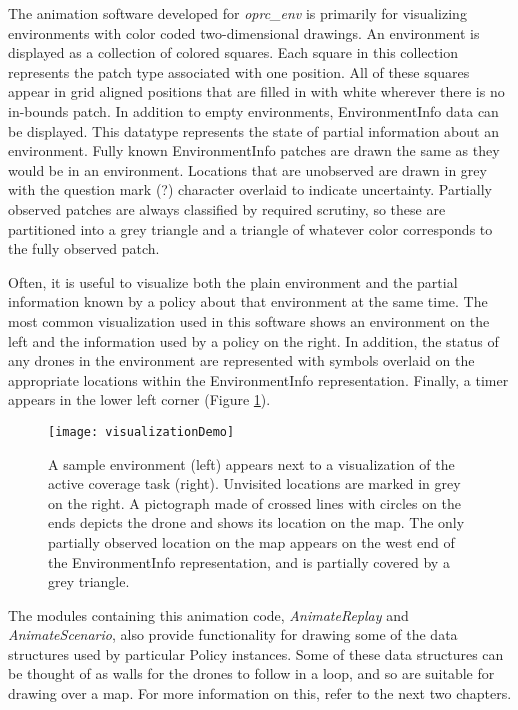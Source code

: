 The animation software developed for \textit{oprc\_env} is primarily for visualizing environments with color coded two-dimensional drawings. An environment is displayed as a collection of colored squares. Each square in this collection represents the patch type associated with one position. All of these squares appear in grid aligned positions that are filled in with white wherever there is no in-bounds patch. In addition to empty environments, EnvironmentInfo data can be displayed. This datatype represents the state of partial information about an environment. Fully known EnvironmentInfo patches are drawn the same as they would be in an environment. Locations that are unobserved are drawn in grey with the question mark (?) character overlaid to indicate uncertainty. Partially observed patches are always classified by required scrutiny, so these are partitioned into a grey triangle and a triangle of whatever color corresponds to the fully observed patch.

Often, it is useful to visualize both the plain environment and the partial information known by a policy about that environment at the same time. The most common visualization used in this software shows an environment on the left and the information used by a policy on the right. In addition, the status of any drones in the environment are represented with symbols overlaid on the appropriate locations within the EnvironmentInfo representation. Finally, a timer appears in the lower left corner (Figure \ref{fig:VizDemo}).

\begin{figure}[H]
\texttt{[image: visualizationDemo]}
\caption[Visualization of a Small Environment During Coverage]{A sample environment (left) appears next to a visualization of the active coverage task (right). Unvisited locations are marked in grey on the right. A pictograph made of crossed lines with circles on the ends depicts the drone and shows its location on the map. The only partially observed location on the map appears on the west end of the EnvironmentInfo representation, and is partially covered by a grey triangle.}
\label {fig:VizDemo}
\end{figure}

The modules containing this animation code, \textit{AnimateReplay} and \textit{AnimateScenario}, also provide functionality for drawing some of the data structures used by particular Policy instances. Some of these data structures can be thought of as walls for the drones to follow in a loop, and so are suitable for drawing over a map. For more information on this, refer to the next two chapters.

